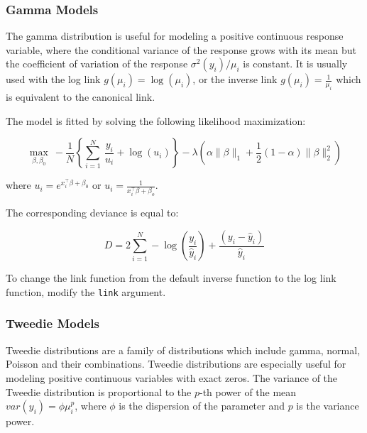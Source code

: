 \subsubsection{Gamma Models}
The gamma distribution is useful for modeling a positive continuous response variable, where the conditional
variance of the response grows with its mean but the coefficient of variation of the response $\sigma^2(y_i)/\mu_i$ is
constant. It is usually used with the log link $g(\mu_i)= \log(\mu_i)$, or the inverse link $g(\mu_i) = \frac{1}{\mu_i} $ which is equivalent to the canonical link.

The model is fitted by solving the following likelihood maximization:

$$  \max_{\beta,\beta_0} \  - \frac{1}{N} \left\{ \sum_{i=1}^N \ \frac{y_i}{u_i} + \log({u_i}) \right\}  - \lambda \left(  \alpha \| \beta \|_1 + \frac{1}{2}(1-\alpha)\| \beta \|_2^2  \right) $$

where $u_i = e^{{x^{\top}_i} \beta + \beta_0}$ or $u_i = \frac{1}{x^{\top}_i \beta + \beta_o}$.

The corresponding deviance is equal to:

$$D = 2\sum_{i=1}^{N} - \log\left({\frac{ y_i }{\hat{y}_i}}\right) + \frac{(y_i - \hat{y}_i)}{\hat{y}_i} $$

To change the link function from the default inverse function to the log link function, modify the \texttt{link}
argument. 

\waterExampleInR



\waterExampleInPython


\subsubsection{Tweedie Models}

Tweedie distributions are a family of distributions which include gamma, normal, Poisson and their combinations. Tweedie distributions are especially useful for modeling positive continuous variables with exact zeros. The variance of the Tweedie distribution is proportional to the $p$-th power of the mean $var(y_i)=\phi \mu_i^p$, where $\phi$ is the dispersion of the parameter and $p$ is the variance power.

